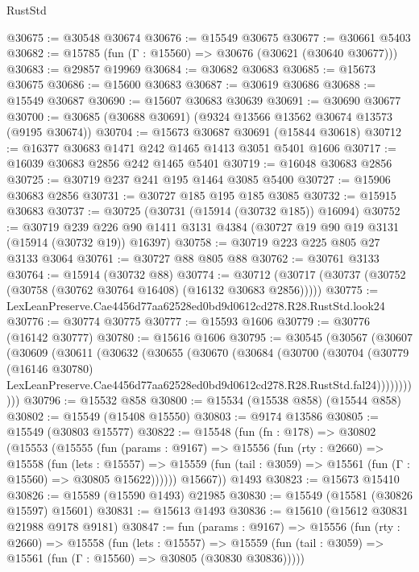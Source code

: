 \begin{lexlean}{RustStd}
\begin{coremodule}
@30675 := @30548 @30674
@30676 := @15549 @30675
@30677 := @30661 @5403
@30682 := @15785 (fun (Γ : @15560) => @30676 (@30621 (@30640 @30677)))
@30683 := @29857 @19969
@30684 := @30682 @30683
@30685 := @15673 @30675
@30686 := @15600 @30683
@30687 := @30619 @30686
@30688 := @15549 @30687
@30690 := @15607 @30683 @30639
@30691 := @30690 @30677
@30700 := @30685 (@30688 @30691) (@9324 @13566 @13562 @30674 @13573 (@9195 @30674))
@30704 := @15673 @30687 @30691 (@15844 @30618)
@30712 := @16377 @30683 @1471 @242 @1465 @1413 @3051 @5401 @1606
@30717 := @16039 @30683 @2856 @242 @1465 @5401
@30719 := @16048 @30683 @2856
@30725 := @30719 @237 @241 @195 @1464 @3085 @5400
@30727 := @15906 @30683 @2856
@30731 := @30727 @185 @195 @185 @3085
@30732 := @15915 @30683
@30737 := @30725 (@30731 (@15914 (@30732 @185)) @16094)
@30752 := @30719
    @239
    @226
    @90
    @1411
    @3131
    @4384
    (@30727 @19 @90 @19 @3131 (@15914 (@30732 @19)) @16397)
@30758 := @30719 @223 @225 @805 @27 @3133 @3064
@30761 := @30727 @88 @805 @88
@30762 := @30761 @3133
@30764 := @15914 (@30732 @88)
@30774 := @30712 (@30717 (@30737 (@30752 (@30758 (@30762 @30764 @16408) (@16132 @30683 @2856)))))
@30775 := LexLeanPreserve.Cae4456d77aa62528ed0bd9d0612cd278.R28.RustStd.look24
@30776 := @30774 @30775
@30777 := @15593 @1606
@30779 := @30776 (@16142 @30777)
@30780 := @15616 @1606
@30795 := @30545
    (@30567
      (@30607
        (@30609
          (@30611
            (@30632
              (@30655
                (@30670
                  (@30684
                    (@30700
                      (@30704
                        (@30779
                          (@16146 @30780)
                          LexLeanPreserve.Cae4456d77aa62528ed0bd9d0612cd278.R28.RustStd.fal24)))))))))))
@30796 := @15532 @858
@30800 := @15534 (@15538 @858) (@15544 @858)
@30802 := @15549 (@15408 @15550)
@30803 := @9174 @13586
@30805 := @15549 (@30803 @15577)
@30822 := @15548
    (fun (fn : @178) =>
    @30802
      (@15553
        (@15555
          (fun (params : @9167) =>
          @15556
            (fun (rty : @2660) =>
            @15558
              (fun (lets : @15557) =>
              @15559 (fun (tail : @3059) => @15561 (fun (Γ : @15560) => @30805 @15622))))))
        @15667))
    @1493
@30823 := @15673 @15410
@30826 := @15589 (@15590 @1493) @21985
@30830 := @15549 (@15581 (@30826 @15597) @15601)
@30831 := @15613 @1493
@30836 := @15610 (@15612 @30831 @21988 @9178 @9181)
@30847 := fun (params : @9167) =>
  @15556
    (fun (rty : @2660) =>
    @15558
      (fun (lets : @15557) =>
      @15559 (fun (tail : @3059) => @15561 (fun (Γ : @15560) => @30805 (@30830 @30836)))))

\end{coremodule}
\end{lexlean}

